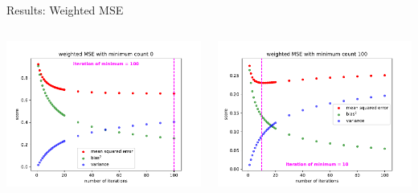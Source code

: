 \documentclass[aspectratio=169]{beamer}
\begin{document}
\begin{frame}{Results: Weighted MSE}
  \begin{columns}
    \begin{column}{.5\textwidth}
      \includegraphics[width=\textwidth]{figures/mse_vs_iter_true_weighted_mincnt_0.pdf}
    \end{column}
    \begin{column}{.5\textwidth}
      \includegraphics[width=\textwidth]{figures/mse_vs_iter_true_weighted_mincnt_100.pdf}
    \end{column}
  \end{columns}
\end{frame}
\end{document}
